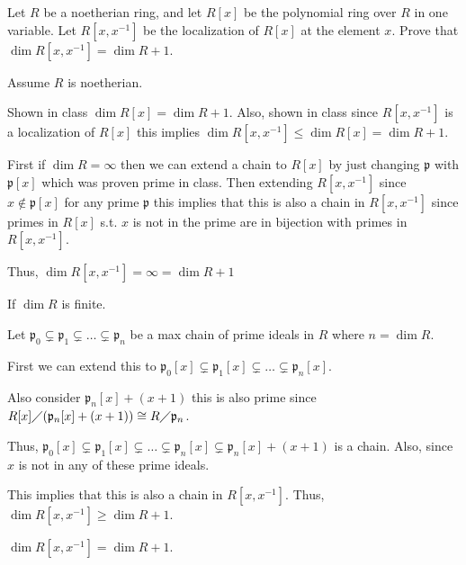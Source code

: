\documentclass[12pt, letterpaper]{article}
\newcommand{\p}{\mathfrak{p}}
\begin{document}
\begin{problem}{}
    Let $R$ be a noetherian ring, and let $R[x]$ be the polynomial ring over $R$ in one variable. Let
$R[x, x^{-1}]$ be the localization of $R[x]$ at the element $x$. Prove that $\dim R[x, x^{-1}] = \dim R + 1$.

\end{problem}
\begin{problemproof}
    Assume $R$ is noetherian.

    Shown in class $\dim R[x] = \dim R + 1$. Also, shown in class since $R[x,x^{-1}]$ is a localization of $R[x]$ this implies $\dim R[x,x^{-1}] \leq \dim R[x] = \dim R + 1$.

    First if $\dim R = \infty$ then we can extend a chain to $R[x]$ by just changing $\p$ with $\p[x]$ which was proven prime in class.
    Then extending $R[x,x^{-1}]$ since $x \notin \p[x]$ for any prime $\p$ this implies that this is also a chain in $R[x,x^{-1}]$ since primes in $R[x]$ s.t. $x$ is not in the prime are in bijection with primes in $R[x,x^{-1}]$.

    Thus, $\dim R[x,x^{-1}] = \infty = \dim R + 1$

    If $\dim R$ is finite.
    
    Let $\p_0 \subsetneq \p_1 \subsetneq \dots \subsetneq \p_n$ be a max chain of prime ideals in $R$ where $n = \dim R$.

    First we can extend this to $\p_0[x] \subsetneq \p_1[x] \subsetneq \dots \subsetneq \p_n[x]$.
    
    Also consider $\p_n[x] + (x+1)$ this is also prime since $R[x] \diagup (\p_n[x] + (x+1)) \cong R \diagup \p_n$.

    Thus, $\p_0[x] \subsetneq \p_1[x] \subsetneq \dots \subsetneq \p_n[x] \subsetneq \p_n[x] + (x+1)$ is a chain. Also, since $x$ is not in any of these prime ideals.
    
    This implies that this is also a chain in $R[x,x^{-1}]$. Thus, $\dim R[x,x^{-1}] \geq \dim R + 1$.

    $\dim R[x,x^{-1}] = \dim R + 1$.
\end{problemproof}
\end{document}
